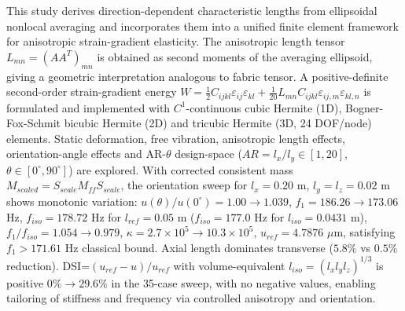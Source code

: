 This study derives direction-dependent characteristic lengths from ellipsoidal nonlocal averaging and incorporates them into a unified finite element framework for anisotropic strain-gradient elasticity. The anisotropic length tensor $L_{mn}=(AA^T)_{mn}$ is obtained as second moments of the averaging ellipsoid, giving a geometric interpretation analogous to fabric tensor. A positive-definite second-order strain-gradient energy $W=\frac12 C_{ijkl}\varepsilon_{ij}\varepsilon_{kl}+\frac1{20}L_{mn}C_{ijkl}\varepsilon_{ij,m}\varepsilon_{kl,n}$ is formulated and implemented with $C^1$-continuous cubic Hermite (1D), Bogner-Fox-Schmit bicubic Hermite (2D) and tricubic Hermite (3D, 24 DOF/node) elements. Static deformation, free vibration, anisotropic length effects, orientation-angle effects and AR-$\theta$ design-space ($AR=l_x/l_y\in[1,20]$, $\theta\in[0^\circ,90^\circ]$) are explored. With corrected consistent mass $M_{scaled}=S_{scale}M_{ff}S_{scale}$, the orientation sweep for $l_x=0.20$ m, $l_y=l_z=0.02$ m shows monotonic variation: $u(\theta)/u(0^\circ)=1.00\to1.039$, $f_1=186.26\to173.06$ Hz, $f_{iso}=178.72$ Hz for $l_{ref}=0.05$ m ($f_{iso}=177.0$ Hz for $l_{iso}=0.0431$ m), $f_1/f_{iso}=1.054\to0.979$, $\kappa=2.7\times10^5\to10.3\times10^5$, $u_{ref}=4.7876$ $\mu$m, satisfying $f_1>171.61$ Hz classical bound. Axial length dominates transverse ($5.8\%$ vs $0.5\%$ reduction). DSI=$(u_{ref}-u)/u_{ref}$ with volume-equivalent $l_{iso}=(l_xl_yl_z)^{1/3}$ is positive $0\%\to29.6\%$ in the 35-case sweep, with no negative values, enabling tailoring of stiffness and frequency via controlled anisotropy and orientation.
